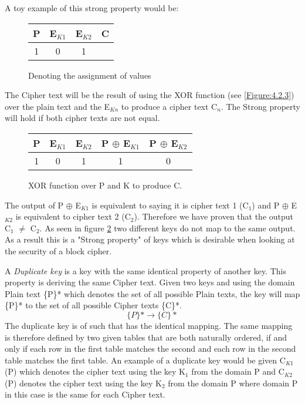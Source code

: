 \documentclass[11pt,a4paper]{report}
\begin{document}
A toy example of this strong property would be:

\begin{figure}[H]
\centering
\label{tab:assignment of values}
\begin{tabular}{|c|c|c|c|}
\hline
P & E$_{K1}$ & E$_{K2}$ & C \\ \hline
1 & 0 & 1 & {}\\
\hline
\end{tabular}
\caption{Denoting the assignment of values}
\end{figure}
The Cipher text will be the result of using the XOR function (see \ref{Figure:4.2.3}) over the plain text and the E$_{Kn}$ to produce a cipher text C$_n$. The Strong property will hold if both cipher texts are not equal.

\begin{figure}[H]
\centering
\label{tab:XOR function}
\begin{tabular}{|c|c|c|c|c|}
\hline
P & E$_{K1}$ & E$_{K2}$ & P $\oplus$ E$_{K1}$ & P $\oplus$ E$_{K2}$\\ \hline
1 & 0 & 1 & 1 & 0 \\
\hline
\end{tabular}
\caption{XOR function over P and K to produce C.}
\end{figure}

The output of P $\oplus$ E$_{K1}$ is equivalent to saying it is cipher text 1 (C$_1$) and P $\oplus$ E$_{K2}$ is equivalent to cipher text 2 (C$_2$). Therefore we have proven that the output C$_1$ $\neq$ C$_2$.
 As seen in figure \ref{tab:XOR function} two different keys do not map to the same output. As a result this is a "Strong property" of keys which is desirable when looking at the security of a block cipher.

 A \emph{Duplicate key} is a key with the same identical property of another key. This property is deriving the same Cipher text. Given two keys and using the domain Plain text \{P\}* which denotes the set of all possible Plain texts, the key will map \{P\}* to the set of all possible Cipher texts \{C\}*.
 \begin{displaymath}
 \{P\}* \rightarrow \{C\}*
 \end{displaymath}
 The duplicate key is of such that has the identical mapping. The same mapping is therefore defined by two given tables that are both naturally ordered, if and only if each row in the first table matches the second and each row in the second table matches the first table.
 An example of a duplicate key would be given C$_{K1}$(P) which denotes the cipher text using the key K$_1$ from the domain P and C$_{K2}$(P) denotes the cipher text using the key K$_2$ from the domain P where domain P in this case is the same for each Cipher text.
\end{document}
